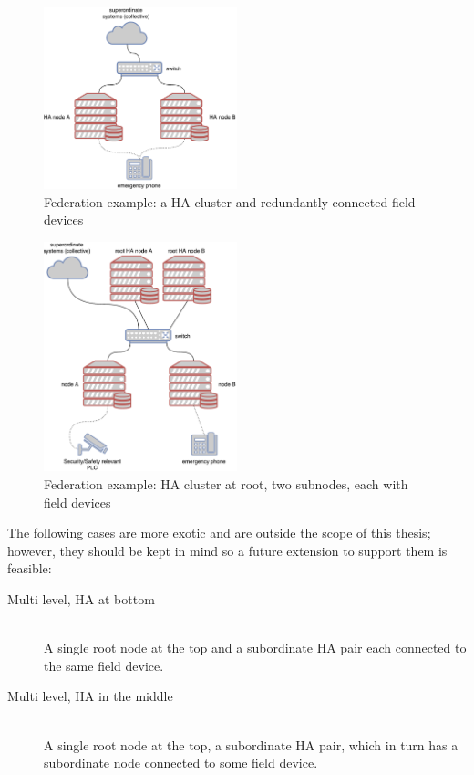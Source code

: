 \begin{figure}[]
	\center
	\includegraphics[width=0.5\textwidth]{img/topo_sl_ha.pdf}
	\caption{Federation example: a HA cluster and redundantly connected field devices}
	\label{fig:topo:sl:ha}
\end{figure}
\begin{figure}[]
	\center
	\includegraphics[width=0.5\textwidth]{img/topo_ml_ha.pdf}
	\caption{Federation example: HA cluster at root, two subnodes, each with field devices}
	\label{fig:topo:ml:ha}
\end{figure}

The following cases are more exotic and are outside the scope of this thesis;
however, they should be kept in mind so a future extension to support them is
feasible:

\begin{description}
	\item [ Multi level, \gls{HA} at bottom ] \hfill\\
	A single root node at the top and a subordinate HA pair each connected
	to the same field device.

	\item [ Multi level, \gls{HA} in the middle ] \hfill\\
	A single root node at the top, a subordinate HA pair, which in turn has
	a subordinate node connected to some field device.
\end{description}

